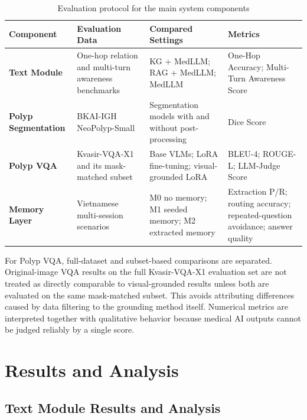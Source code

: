 \begin{table}[H]
\centering
\small
\renewcommand{\arraystretch}{1.18}
\begin{tabularx}{\textwidth}{>{\raggedright\arraybackslash}p{}
                                >{\raggedright\arraybackslash}X
                                >{\raggedright\arraybackslash}X
                                >{\raggedright\arraybackslash}X}
\toprule
\textbf{Component} & \textbf{Evaluation Data} & \textbf{Compared Settings} & \textbf{Metrics} \\
\midrule
\textbf{Text Module} & One-hop relation and multi-turn awareness benchmarks & KG + MedLLM; RAG + MedLLM; MedLLM & One-Hop Accuracy; Multi-Turn Awareness Score \\
\midrule
\textbf{Polyp Segmentation} & BKAI-IGH NeoPolyp-Small & Segmentation models with and without post-processing & Dice Score \cite{dice} \\
\midrule
\textbf{Polyp VQA} & Kvasir-VQA-X1 and its mask-matched subset & Base VLMs; LoRA fine-tuning; visual-grounded LoRA & BLEU-4; ROUGE-L; LLM-Judge Score \cite{bleu,rouge,llm_as_judge} \\
\midrule
\textbf{Memory Layer} & 30 Vietnamese multi-session scenarios & M0 no memory; M1 seeded memory; M2 extracted memory & Extraction P/R; routing accuracy; repeated-question avoidance; answer quality \\
\bottomrule
\end{tabularx}
\caption{Evaluation protocol for the main system components}
\label{table:evaluation-design}
\end{table}

For Polyp VQA, full-dataset and subset-based comparisons are separated. Original-image VQA results on the full Kvasir-VQA-X1 evaluation set are not treated as directly comparable to visual-grounded results unless both are evaluated on the same mask-matched subset. This avoids attributing differences caused by data filtering to the grounding method itself. Numerical metrics are interpreted together with qualitative behavior because medical AI outputs cannot be judged reliably by a single score.

\section{Results and Analysis}

\subsection{Text Module Results and Analysis}


